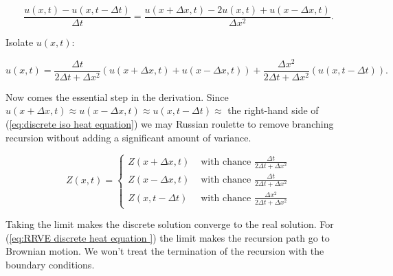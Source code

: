 \documentclass[a4paper,12pt]{article}
\begin{document}
\begin{equation}
    \frac{u(x,t)-u(x,t-\Delta t)}{\Delta t} = \frac{u(x + \Delta x,t)-2 u(x,t) +u(x - \Delta x,t)}{\Delta x^{2}} .
\end{equation}

Isolate $u(x,t)$:

\begin{equation} \label{eq:discrete iso heat equation}
    u(x,t) =
    \frac{\Delta t}{ 2 \Delta t + \Delta x^{2}}
    \left(
    u(x+\Delta x,t)+u(x-\Delta x,t)
    \right) +
    \frac{\Delta x^{2}}{ 2 \Delta t + \Delta x^{2}}
    \left(
    u(x,t-\Delta t)
    \right).
\end{equation}

Now comes the essential step in the derivation.
Since $u(x+\Delta x,t) \approx u(x-\Delta x,t) \approx u(x,t-\Delta t) \approx$
the right-hand side of (\ref{eq:discrete iso heat equation}) we may Russian roulette
to remove branching recursion without adding a significant amount of variance.

\begin{equation} \label{eq:RRVE discrete heat equation }
    Z(x,t) =
    \begin{cases}
        Z(x+\Delta x , t)  & \text{ with chance  } \frac{\Delta t}{ 2 \Delta t + \Delta x^{2}}     \\
        Z(x-\Delta x , t)  & \text{ with chance  } \frac{\Delta t}{ 2 \Delta t + \Delta x^{2}}     \\
        Z(x, t - \Delta t) & \text{ with chance  } \frac{\Delta x^{2}}{ 2 \Delta t + \Delta x^{2}}
    \end{cases}
\end{equation}

Taking the limit
makes the discrete solution converge to the real solution.
For (\ref{eq:RRVE discrete heat equation }) the limit
makes the recursion path go to Brownian motion. We won't treat
the termination of the recursion with the boundary conditions.


\newpage
\begin{abstract}
    
\end{abstract}

\printbibliography
\newpage
\end{document}
